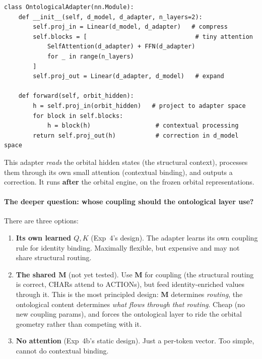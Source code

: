 \documentclass[11pt, a4paper]{article}
\newcommand{\M}{\mathbf{M}}
\theoremstyle{remark}
\begin{document}
\begin{lstlisting}[caption={Contextual ontological adapter (Exp 4)}]
class OntologicalAdapter(nn.Module):
    def __init__(self, d_model, d_adapter, n_layers=2):
        self.proj_in = Linear(d_model, d_adapter)   # compress
        self.blocks = [                              # tiny attention
            SelfAttention(d_adapter) + FFN(d_adapter)
            for _ in range(n_layers)
        ]
        self.proj_out = Linear(d_adapter, d_model)   # expand

    def forward(self, orbit_hidden):
        h = self.proj_in(orbit_hidden)   # project to adapter space
        for block in self.blocks:
            h = block(h)                  # contextual processing
        return self.proj_out(h)           # correction in d_model space
\end{lstlisting}

\noindent
This adapter \emph{reads} the orbital hidden states (the structural context), processes them through its own small attention (contextual binding), and outputs a correction.
It runs \textbf{after} the orbital engine, on the frozen orbital representations.

\paragraph{The deeper question: whose coupling should the ontological layer use?}

There are three options:
\begin{enumerate}[nosep]
    \item \textbf{Its own learned $Q, K$} (Exp~4's design).
    The adapter learns its own coupling rule for identity binding.
    Maximally flexible, but expensive and may not share structural routing.

    \item \textbf{The shared $\M$} (not yet tested).
    Use $\M$ for coupling (the structural routing is correct, CHARs attend to ACTIONs),
    but feed identity-enriched values through it.
    This is the most principled design: $\M$ determines \emph{routing}, the ontological
    content determines \emph{what flows through that routing}.
    Cheap (no new coupling params), and forces the ontological layer to ride the
    orbital geometry rather than competing with it.

    \item \textbf{No attention} (Exp~4b's static design).
    Just a per-token vector.
    Too simple, cannot do contextual binding.
\end{enumerate}
\end{document}
